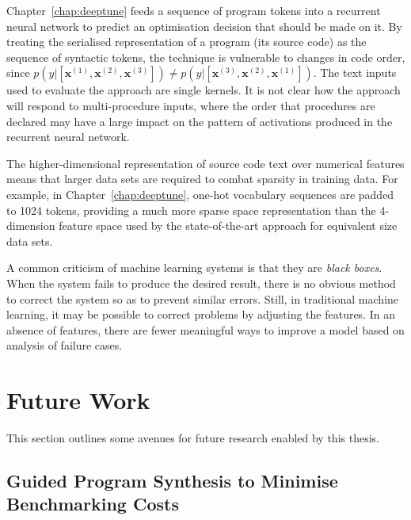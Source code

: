 Chapter~\ref{chap:deeptune} feeds a sequence of program tokens into a recurrent neural network to predict an optimisation decision that should be made on it. By treating the serialised representation of a program (its source code) as the sequence of syntactic tokens, the technique is vulnerable to changes in code order, since $p(y|[\bm{x}^{(1)}, \bm{x}^{(2)}, \bm{x}^{(3)}]) \ne p(y|[\bm{x}^{(3)}, \bm{x}^{(2)}, \bm{x}^{(1)}])$. The text inputs used to evaluate the approach are single kernels. It is not clear how the approach will respond to multi-procedure inputs, where the order that procedures are declared may have a large impact on the pattern of activations produced in the recurrent neural network.



The higher-dimensional representation of source code text over numerical features means that larger data sets are required to combat sparsity in training data. For example, in Chapter~\ref{chap:deeptune}, one-hot vocabulary sequences are padded to 1024 tokens, providing a much more sparse space representation than the 4-dimension feature space used by the state-of-the-art approach for equivalent size data sets.

A common criticism of machine learning systems is that they are \emph{black boxes}. When the system fails to produce the desired result, there is no obvious method to correct the system so as to prevent similar errors. Still, in traditional machine learning, it may be possible to correct problems by adjusting the features. In an absence of features, there are fewer meaningful ways to improve a model based on analysis of failure cases.


\section{Future Work}
\label{sec:conclusions-future-work}

This section outlines some avenues for future research enabled by this thesis.

\subsection{Guided Program Synthesis to Minimise Benchmarking Costs}

